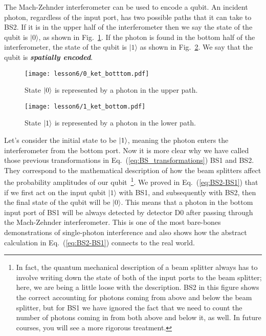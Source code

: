 The Mach-Zehnder interferometer can be used to encode a qubit.
An incident photon, regardless of the input port, has two possible paths that it can take to BS2.
If it is in the upper half of the interferometer then we say the state of the qubit is $|0\rangle$, as shown in Fig.~\ref{fig:m-z-upper}.
If the photon is found in the bottom half of the interferometer, the state of the qubit is $|1\rangle$ as shown in Fig.~\ref{fig:m-z-lower}.
We say that the qubit is \textbf{\emph{spatially encoded}}.
\begin{figure}[t]
   \centering
    \texttt{[image: lesson6/0\_ket\_botttom.pdf]}
    \caption[State $|0\rangle$ in the MI interferometer.]{State $\left| 0 \right\rangle$ is represented by a photon in the upper path.}
    \label{fig:m-z-upper}
\end{figure}
\begin{figure}[t]
   \centering
    \texttt{[image: lesson6/1\_ket\_bottom.pdf]}
    \caption[State $|1\rangle$ in the MI interferometer.]{State $\left| 1 \right\rangle$ is represented by a photon in the lower path.}
    \label{fig:m-z-lower}
\end{figure}

Let's consider the initial state to be $\left| 1 \right\rangle$, meaning the photon enters the interferometer from the bottom port.
Now it is more clear why we have called those previous transformations in Eq.~(\ref{eq:BS_transformations}) BS1 and BS2.
They correspond to the mathematical description of how the beam splitters affect the probability amplitudes of our qubit~\footnote{In fact, the quantum mechanical description of a beam splitter always has to involve writing down the state of both of the input ports to the beam splitter; here, we are being a little loose with the description. BS2 in this figure shows the correct accounting for photons coming from above and below the beam splitter, but for BS1 we have ignored the fact that we need to count the number of photons coming in from both above and below it, as well.  In future courses, you will see a more rigorous treatment.}.
We proved in Eq.~(\ref{eq:BS2-BS1}) that if we first act on the input qubit $|1\rangle$ with BS1, and subsequently with BS2, then the final state of the qubit will be $|0\rangle$.
This means that a photon in the bottom input port of BS1 will be always detected by detector D0 after passing through the Mach-Zehnder interferometer.
This is one of the most bare-bones demonstrations of single-photon interference and also shows how the abstract calculation in Eq.~(\ref{eq:BS2-BS1}) connects to the real world.

